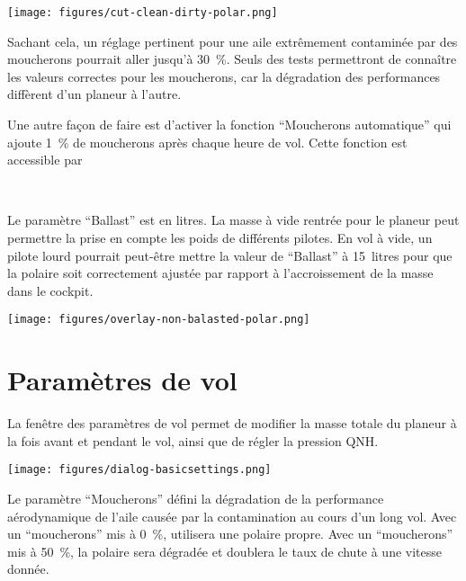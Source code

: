 \begin{center}
\texttt{[image: figures/cut-clean-dirty-polar.png]}
\end{center}
Sachant cela, un réglage pertinent pour une aile extrêmement contaminée par des moucherons pourrait aller jusqu'à 30~\%.
Seuls des tests permettront de connaître les valeurs correctes pour les moucherons, car la dégradation des performances diffèrent d'un planeur à l'autre.

Une autre façon de faire est d'activer la fonction ``Moucherons automatique'' qui ajoute 1~\% de moucherons après chaque heure de vol.
Cette fonction est accessible par 

\blink{}\blink{}
\blink\\\blink{}

Le paramètre ``Ballast'' est en litres.
La masse à vide rentrée pour le planeur peut permettre la prise en compte les poids de différents pilotes.
En vol à vide, un pilote lourd pourrait peut-être mettre la valeur de ``Ballast'' à 15~litres pour que la polaire soit correctement ajustée par rapport à l'accroissement de la masse dans le cockpit.

\begin{center}
\texttt{[image: figures/overlay-non-balasted-polar.png]}
\end{center}


\section{Paramètres de vol}\label{sec:flight-setup}
La fenêtre des paramètres de vol permet de modifier la masse totale du planeur à la fois avant et pendant le vol, ainsi que de régler la pression QNH.\@

\begin{center}
\texttt{[image: figures/dialog-basicsettings.png]}
\end{center}

Le paramètre ``Moucherons'' défini la dégradation de la performance aérodynamique de l'aile causée par la contamination au cours d'un long vol.
Avec un ``moucherons'' mis à 0~\%, \xc{} utilisera une polaire propre.
Avec un ``moucherons'' mis à 50~\%, la polaire sera dégradée et doublera le taux de chute à une vitesse donnée.

